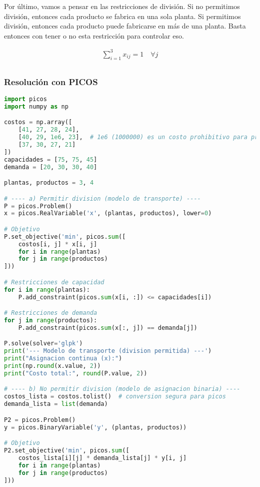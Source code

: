 \documentclass[12pt]{article}
\begin{document}
Por último, vamos a pensar en las restricciones de división. Si no permitimos división, entonces cada producto se fabrica en una sola planta. Si permitimos división, entonces cada producto puede fabricarse en más de una planta. Basta entonces con tener o no esta restricción para controlar eso.

\begin{align*}
    \sum_{i=1}^{3} x_{ij} = 1 \quad \forall j \\
\end{align*}

\subsubsection{Resolución con PICOS}
\begin{lstlisting}[language=Python]
import picos
import numpy as np

costos = np.array([
    [41, 27, 28, 24],
    [40, 29, 1e6, 23],  # 1e6 (1000000) es un costo prohibitivo para producto 3 en planta 2
    [37, 30, 27, 21]
])
capacidades = [75, 75, 45]
demanda = [20, 30, 30, 40]

plantas, productos = 3, 4

# ---- a) Permitir division (modelo de transporte) ----
P = picos.Problem()
x = picos.RealVariable('x', (plantas, productos), lower=0)

# Objetivo
P.set_objective('min', picos.sum([
    costos[i, j] * x[i, j]
    for i in range(plantas)
    for j in range(productos)
]))

# Restricciones de capacidad
for i in range(plantas):
    P.add_constraint(picos.sum(x[i, :]) <= capacidades[i])

# Restricciones de demanda
for j in range(productos):
    P.add_constraint(picos.sum(x[:, j]) == demanda[j])

P.solve(solver='glpk')
print('--- Modelo de transporte (division permitida) ---')
print("Asignacion continua (x):")
print(np.round(x.value, 2))
print("Costo total:", round(P.value, 2))

# ---- b) No permitir division (modelo de asignacion binaria) ----
costos_lista = costos.tolist()  # conversion segura para picos
demanda_lista = list(demanda)

P2 = picos.Problem()
y = picos.BinaryVariable('y', (plantas, productos))

# Objetivo
P2.set_objective('min', picos.sum([
    costos_lista[i][j] * demanda_lista[j] * y[i, j]
    for i in range(plantas)
    for j in range(productos)
]))


\end{lstlisting}
\end{document}
